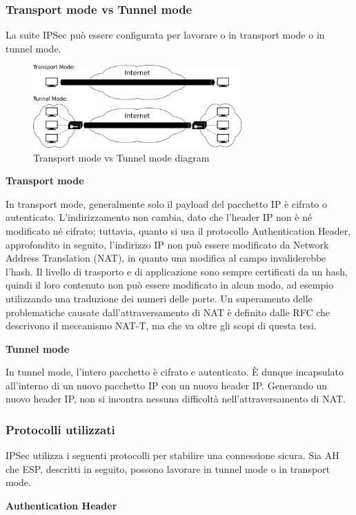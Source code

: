 \subsubsection{Transport mode vs Tunnel mode}
La suite IPSec può essere configurata per lavorare o in transport mode o in tunnel mode.
\begin{figure}[ht]
    \centering
    \includegraphics[width=8cm]{figure/ipsec_modes.png}
    \caption{Transport mode vs Tunnel mode diagram}
\end{figure}


\noindent \textbf{Transport mode}

In transport mode, generalmente solo il payload del pacchetto IP è cifrato o autenticato. L'indirizzamento non cambia, dato che l'header IP non è né modificato né cifrato; tuttavia, quanto si usa il protocollo Authentication Header, approfondito in seguito, l'indirizzo IP non può essere modificato da Network Address Translation (NAT), in quanto una modifica al campo invaliderebbe l'hash. Il livello di trasporto e di applicazione sono sempre certificati da un hash, quindi il loro contenuto non può essere modificato in alcun modo, ad esempio utilizzando una traduzione dei numeri delle porte.
Un superamento delle problematiche causate dall'attraversamento di NAT è definito dalle RFC che descrivono il meccanismo NAT-T, ma che va oltre gli scopi di questa tesi.

\newpage
\noindent \textbf{Tunnel mode}

In tunnel mode, l'intero pacchetto è cifrato e autenticato. È dunque incapsulato all'interno di un nuovo pacchetto IP con un nuovo header IP.
Generando un nuovo header IP, non si incontra nessuna difficoltà nell'attraversamento di NAT.


\subsubsection{Protocolli utilizzati}
IPSec utilizza i seguenti protocolli per stabilire una connessione sicura. Sia AH che ESP, descritti in seguito, possono lavorare in tunnel mode o in transport mode.

\noindent \textbf{Authentication Header}

